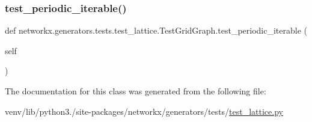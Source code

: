 \subsubsection{\texorpdfstring{test\+\_\+periodic\+\_\+iterable()}{test\_periodic\_iterable()}}
{\footnotesize\ttfamily def networkx.\+generators.\+tests.\+test\+\_\+lattice.\+Test\+Grid\+Graph.\+test\+\_\+periodic\+\_\+iterable (\begin{DoxyParamCaption}\item[{}]{self }\end{DoxyParamCaption})}



The documentation for this class was generated from the following file\+:\begin{DoxyCompactItemize}
\item 
venv/lib/python3./site-\/packages/networkx/generators/tests/\hyperlink{test__lattice_8py}{test\+\_\+lattice.\+py}\end{DoxyCompactItemize}
